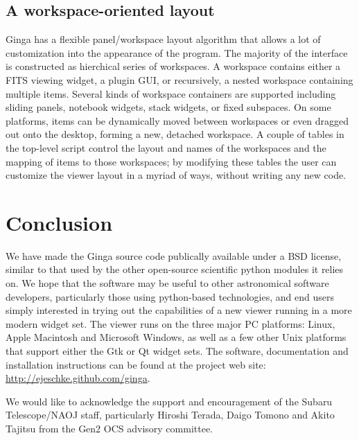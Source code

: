 \subsection{A workspace-oriented layout}
Ginga has a flexible panel/workspace layout algorithm that allows a
lot of customization into the appearance of the program.  The majority
of the interface is constructed as hierchical series of workspaces.
A workspace contains either a FITS viewing widget, a plugin GUI, or
recursively, a nested workspace containing multiple items.
Several kinds of workspace containers are supported including sliding
panels, notebook widgets, stack widgets, or fixed subspaces. 
On some platforms, items can be dynamically moved between workspaces or
even dragged out onto the desktop, forming a new, detached workspace.
A couple of tables in the top-level script control the layout and names of
the workspaces and the mapping of items to those workspaces;
by modifying these tables the user can customize the viewer layout in a
myriad of ways, without writing any new code. 

\section{Conclusion}
We have made the Ginga source code publically available under a BSD
license, similar to that used by the other open-source scientific python
modules it relies on. 
We hope that the software may be useful to other astronomical software
developers, particularly those using python-based technologies, and end
users simply interested in trying out the capabilities of a new viewer
running in a more modern widget set.  The viewer runs on the three major
PC platforms: Linux, Apple Macintosh and Microsoft Windows, as well as a
few other Unix platforms that support either the Gtk or Qt widget sets.
The software, documentation and installation instructions can be found
at the project web site: \url{http://ejeschke.github.com/ginga}.

\acknowledgements We would like to acknowledge the support and
encouragement of the Subaru Telescope/NAOJ staff, particularly Hiroshi
Terada, Daigo Tomono and Akito Tajitsu from the Gen2 OCS advisory
committee. 



